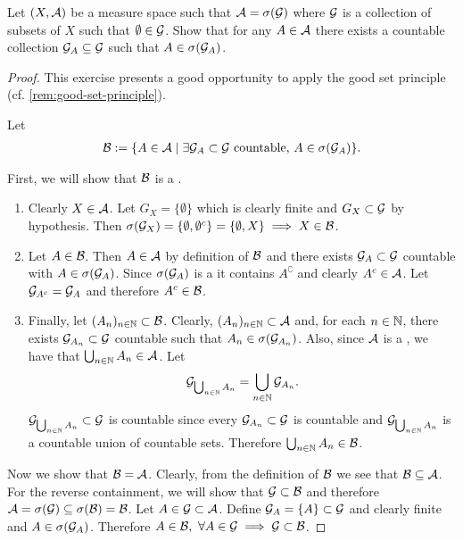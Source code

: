 \begin{ex}
	Let $(X, \mathcal{A})$ be a measure space such that $\mathcal{A} = \sigma(\mathcal{G})$ where $\mathcal{G}$ is a collection of subsets of $X$ such that $\emptyset \in \mathcal{G}$. Show that for any $A \in \mathcal{A}$ there exists a countable collection $\mathcal{G}_A \subseteq \mathcal{G}$ such that $A \in \sigma(\mathcal{G}_A)$.
\end{ex}

\begin{proof}
	This exercise presents a good opportunity to apply the good set principle (cf. \autoref{rem:good-set-principle}).
	
	Let
	\begin{align*}
		\mathcal{B} := \{ A \in \mathcal{A} \mid \exists \mathcal{G}_A \subset \mathcal{G} \text{ countable, } A \in \sigma(\mathcal{G}_A)\}.
	\end{align*}
	
	First, we will show that $\mathcal{B}$ is a \siga.
	\begin{enumerate}
		\item Clearly $X \in \mathcal{A}$. Let $G_X = \{\emptyset\}$ which is clearly finite and $G_X \subset \mathcal{G}$ by hypothesis. Then $\sigma(\mathcal{G}_X) = \{\emptyset, \emptyset^c\} = \{\emptyset, X\} \implies X \in \mathcal{B}$.
		\item Let $A \in \mathcal{B}$. Then $A \in \mathcal{A}$ by definition of $\mathcal{B}$ and there exists $\mathcal{G}_A \subset \mathcal{G}$ countable with $A \in \sigma(\mathcal{G}_A)$. Since $\sigma(\mathcal{G}_A)$ is a \siga it contains $A^\complement$ and clearly $A^c \in \mathcal{A}$. Let $\mathcal{G}_{A^c} = \mathcal{G}_A$ and therefore $A^c \in \mathcal{B}$.
		\item Finally, let $(A_n)_{n\in\mathbb{N}} \subset \mathcal{B}$. Clearly, $(A_n)_{n\in\mathbb{N}} \subset \mathcal{A}$ and, for each $n \in \mathbb{N}$, there exists $\mathcal{G}_{A_n} \subset \mathcal{G}$ countable such that $A_n \in \sigma(\mathcal{G}_{A_n})$. Also, since $\mathcal{A}$ is a \siga, we have that $\bigcup_{n\in\mathbb{N}}A_n \in \mathcal{A}$. Let
		\begin{align*}
			\mathcal{G}_{\bigcup_{n\in\mathbb{N}} A_n} = \bigcup_{n\in\mathbb{N}} \mathcal{G}_{A_n}.
		\end{align*}
		$\mathcal{G}_{\bigcup_{n\in\mathbb{N}} A_n} \subset \mathcal{G}$ is countable since every $\mathcal{G}_{A_n} \subset \mathcal{G}$ is countable and $\mathcal{G}_{\bigcup_{n\in\mathbb{N}} A_n}$ is a countable union of countable sets. Therefore $\bigcup_{n\in\mathbb{N}} A_n \in \mathcal{B}$.
	\end{enumerate}

	Now we show that $\mathcal{B} = \mathcal{A}$. Clearly, from the definition of $\mathcal{B}$ we see that $\mathcal{B} \subseteq \mathcal{A}$. For the reverse containment, we will show that $\mathcal{G} \subset \mathcal{B}$ and therefore $\mathcal{A} = \sigma(\mathcal{G}) \subseteq \sigma(\mathcal{B}) = \mathcal{B}$. Let $A \in \mathcal{G} \subset \mathcal{A}$. Define $\mathcal{G}_A = \{A\} \subset \mathcal{G}$ and clearly finite and $A \in \sigma(\mathcal{G}_A)$. Therefore $A \in \mathcal{B},\ \forall A \in \mathcal{G} \implies \mathcal{G}\subset \mathcal{B}$.
\end{proof}

